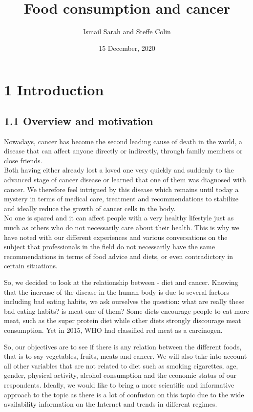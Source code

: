 \documentclass[
]{article}
\title{Food consumption and cancer}
\author{Ismail Sarah and Steffe Colin}
\date{15 December, 2020}
\begin{document}
\maketitle

\hypertarget{introduction}{%
\section{\texorpdfstring{1
\textbf{Introduction}}{1 Introduction}}\label{introduction}}

\hypertarget{overview-and-motivation}{%
\subsection{1.1 Overview and motivation}\label{overview-and-motivation}}

Nowadays, cancer has become the second leading cause of death in the
world, a disease that can affect anyone directly or indirectly, through
family members or close friends.\\
Both having either already lost a loved one very quickly and suddenly to
the advanced stage of cancer disease or learned that one of them was
diagnosed with cancer. We therefore feel intrigued by this disease which
remains until today a mystery in terms of medical care, treatment and
recommendations to stabilize and ideally reduce the growth of cancer
cells in the body.\\
No one is spared and it can affect people with a very healthy lifestyle
just as much as others who do not necessarily care about their health.
This is why we have noted with our different experiences and various
conversations on the subject that professionals in the field do not
necessarily have the same recommendations in terms of food advice and
diets, or even contradictory in certain situations.

So, we decided to look at the relationship between - diet and cancer.
Knowing that the increase of the disease in the human body is due to
several factors including bad eating habits, we ask ourselves the
question: what are really these bad eating habits? is meat one of them?
Some diets encourage people to eat more meat, such as the super protein
diet while other diets strongly discourage meat consumption. Yet in
2015, WHO had classified red meat as a carcinogen.

So, our objectives are to see if there is any relation between the
different foods, that is to say vegetables, fruits, meats and cancer. We
will also take into account all other variables that are not related to
diet such as smoking cigarettes, age, gender, physical activity, alcohol
consumption and the economic status of our respondents. Ideally, we
would like to bring a more scientific and informative approach to the
topic as there is a lot of confusion on this topic due to the wide
availability information on the Internet and trends in different
regimes.
\end{document}
